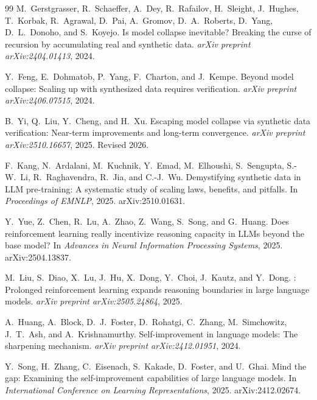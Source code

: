\documentclass[11pt,a4paper]{article}
\begin{document}
\begin{thebibliography}{99}
M.~Gerstgrasser, R.~Schaeffer, A.~Dey, R.~Rafailov, H.~Sleight, J.~Hughes, T.~Korbak, R.~Agrawal, D.~Pai, A.~Gromov, D.~A.~Roberts, D.~Yang, D.~L.~Donoho, and S.~Koyejo.
\newblock Is model collapse inevitable? {B}reaking the curse of recursion by accumulating real and synthetic data.
\newblock \emph{arXiv preprint arXiv:2404.01413}, 2024.

Y.~Feng, E.~Dohmatob, P.~Yang, F.~Charton, and J.~Kempe.
\newblock Beyond model collapse: Scaling up with synthesized data requires verification.
\newblock \emph{arXiv preprint arXiv:2406.07515}, 2024.

B.~Yi, Q.~Liu, Y.~Cheng, and H.~Xu.
\newblock Escaping model collapse via synthetic data verification: Near-term improvements and long-term convergence.
\newblock \emph{arXiv preprint arXiv:2510.16657}, 2025. Revised 2026.

F.~Kang, N.~Ardalani, M.~Kuchnik, Y.~Emad, M.~Elhoushi, S.~Sengupta, S.-W.~Li, R.~Raghavendra, R.~Jia, and C.-J.~Wu.
\newblock Demystifying synthetic data in {LLM} pre-training: A systematic study of scaling laws, benefits, and pitfalls.
\newblock In \emph{Proceedings of EMNLP}, 2025.
\newblock arXiv:2510.01631.

Y.~Yue, Z.~Chen, R.~Lu, A.~Zhao, Z.~Wang, S.~Song, and G.~Huang.
\newblock Does reinforcement learning really incentivize reasoning capacity in {LLM}s beyond the base model?
\newblock In \emph{Advances in Neural Information Processing Systems}, 2025.
\newblock arXiv:2504.13837.

M.~Liu, S.~Diao, X.~Lu, J.~Hu, X.~Dong, Y.~Choi, J.~Kautz, and Y.~Dong.
: Prolonged reinforcement learning expands reasoning boundaries in large language models.
\newblock \emph{arXiv preprint arXiv:2505.24864}, 2025.

A.~Huang, A.~Block, D.~J.~Foster, D.~Rohatgi, C.~Zhang, M.~Simchowitz, J.~T.~Ash, and A.~Krishnamurthy.
\newblock Self-improvement in language models: The sharpening mechanism.
\newblock \emph{arXiv preprint arXiv:2412.01951}, 2024.

Y.~Song, H.~Zhang, C.~Eisenach, S.~Kakade, D.~Foster, and U.~Ghai.
\newblock Mind the gap: Examining the self-improvement capabilities of large language models.
\newblock In \emph{International Conference on Learning Representations}, 2025.
\newblock arXiv:2412.02674.


\end{thebibliography}
\end{document}
